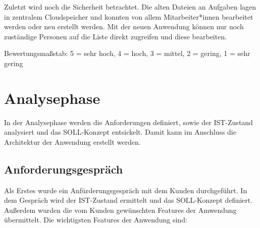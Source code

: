 \documentclass[12pt]{article}
\begin{document}
Zuletzt wird noch die Sicherheit betrachtet. Die alten Dateien an Aufgaben lagen in zentralem Cloudspeicher und konnten von allem Mitarbeiter*innen bearbeitet werden 
oder neu erstellt werden. Mit der neuen Anwendung können nur noch zuständige Personen auf die Liste direkt zugreifen und diese bearbeiten.  

\begin{table}[H]
    Bewertungsmaßstab: 5 = sehr hoch, 4 = hoch, 3 = mittel, 2 = gering, 1 = sehr gering
    \caption{Nutzwertanalyse}
    \label{table:weightedsum}
\end{table}



%
%

\section{Analysephase}
In der Analysephase werden die Anforderungen definiert, sowie der IST-Zustand analysiert und das
SOLL-Konzept entsickelt. Damit kann im Anschluss die Architektur der Anwendung erstellt werden.

\subsection{Anforderungsgespräch}
Als Erstes wurde ein Anfürderungsgespräch mit dem Kunden durchgeführt.
In dem Gespräch wird der IST-Zustand ermittelt und das SOLL-Konzept definiert.
Außerdem wurden die vom Kunden gewünschten Features der Amwendung übermittelt.
Die wichtigsten Features der Anwendung sind:
\end{document}
